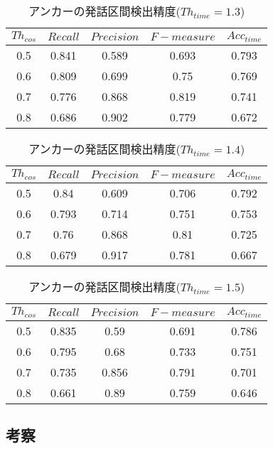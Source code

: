 \begin{table}[H]
  \begin{center}
    \caption{アンカーの発話区間検出精度($Th_{time}=1.3$) \label{table:result_get_anchor13}}
    \begin{tabular}{|c||c|c|c|c|} \hline
      $Th_{cos}$ & $Recall$ & $Precision$ & $F-measure$ & $Acc_{time}$\\ \hline
0.5 & 0.841 & 0.589 & 0.693 & 0.793 \\ \hline
0.6 & 0.809 & 0.699 & 0.75 & 0.769 \\ \hline
0.7 & 0.776 & 0.868 & 0.819 & 0.741 \\ \hline
0.8 & 0.686 & 0.902 & 0.779 & 0.672 \\ \hline

    \end{tabular}
  \end{center}
\end{table}

\begin{table}[H]
  \begin{center}
    \caption{アンカーの発話区間検出精度($Th_{time}=1.4$) \label{table:result_get_anchor14}}
    \begin{tabular}{|c||c|c|c|c|} \hline
      $Th_{cos}$ & $Recall$ & $Precision$ & $F-measure$ & $Acc_{time}$\\ \hline
0.5 & 0.84 & 0.609 & 0.706 & 0.792 \\ \hline
0.6 & 0.793 & 0.714 & 0.751 & 0.753 \\ \hline
0.7 & 0.76 & 0.868 & 0.81 & 0.725 \\ \hline
0.8 & 0.679 & 0.917 & 0.781 & 0.667 \\ \hline

    \end{tabular}
  \end{center}
\end{table}

\begin{table}[H]
  \begin{center}
    \caption{アンカーの発話区間検出精度($Th_{time}=1.5$) \label{table:result_get_anchor15}}
    \begin{tabular}{|c||c|c|c|c|} \hline
      $Th_{cos}$ & $Recall$ & $Precision$ & $F-measure$ & $Acc_{time}$\\ \hline
0.5 & 0.835 & 0.59 & 0.691 & 0.786 \\ \hline
0.6 & 0.795 & 0.68 & 0.733 & 0.751 \\ \hline
0.7 & 0.735 & 0.856 & 0.791 & 0.701 \\ \hline
0.8 & 0.661 & 0.89 & 0.759 & 0.646 \\ \hline

    \end{tabular}
  \end{center}
\end{table}
\subsection{考察}

